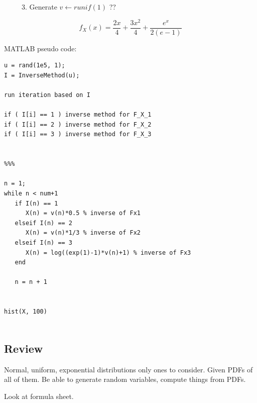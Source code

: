 \documentclass{report}
\begin{document}
\ \ \ \ \ 3. Generate $v \leftarrow runif(1)$ ??
 
$$f_X(x) = \frac{2x}{4} + \frac{3x^2}{4} + \frac{e^x}{2(e-1)}$$
  
MATLAB pseudo code:

\begin{verbatim}
u = rand(1e5, 1);
I = InverseMethod(u);

run iteration based on I

if ( I[i] == 1 ) inverse method for F_X_1
if ( I[i] == 2 ) inverse method for F_X_2
if ( I[i] == 3 ) inverse method for F_X_3


%%%

n = 1;
while n < num+1
   if I(n) == 1
      X(n) = v(n)*0.5 % inverse of Fx1
   elseif I(n) == 2
      X(n) = v(n)*1/3 % inverse of Fx2
   elseif I(n) == 3
      X(n) = log((exp(1)-1)*v(n)+1) % inverse of Fx3
   end
   
   n = n + 1
   
   
hist(X, 100)


\end{verbatim}

 \subsection{Review}
 
 Normal, uniform, exponential distributions only ones to consider. Given PDFs of all of them. Be able to generate random variables, compute things from PDFs. 
 
 Look at formula sheet.
 
\end{document}
